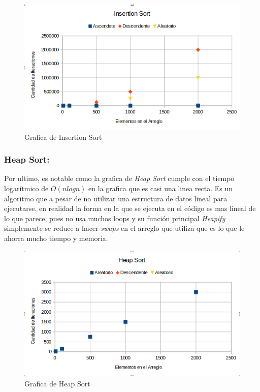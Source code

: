 \documentclass{article}
\begin{document}
	
			\begin{figure}[H]
				\centering
				\includegraphics[scale = 0.65]{images/insertion- graph}
				\caption{Grafica de Insertion Sort}
			\end{figure}
			\newpage
			
				
			\subsubsection{Heap Sort:}
			
			Por ultimo, es notable como la grafica de \emph{Heap Sort} cumple con el tiempo logarítmico de $O(n log n)$ en la grafica que es casi una linea recta. Es un algoritmo que a pesar de no utilizar una estructura de datos lineal para ejecutarse, en realidad la forma en la que se ejecuta en el código es mas lineal de lo que parece, pues no usa muchos loops y su función principal \emph{Heapify} simplemente se reduce a hacer \emph{swaps} en el arreglo que utiliza que es lo que le ahorra mucho tiempo y memoria.

			\begin{figure}[H]
				\centering
				\includegraphics[scale = 0.6]{images/heap-graph}
				\caption{Grafica de Heap Sort}
			\end{figure}		
			\newpage
		
\end{document}
